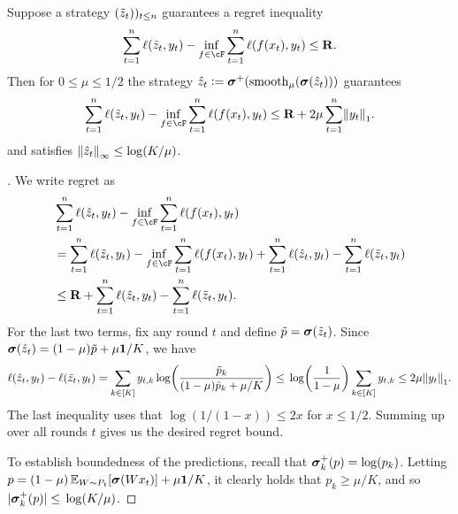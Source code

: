\begin{lemma}
  \label{lem:logistic_bounded}
  Suppose a strategy $(\zt_{t}))_{t\leq{}n}$ guarantees a regret inequality
  \[
    \sum_{t=1}^{n}\ls(\zt_t,y_t) - \inf_{f\in\cF}\sum_{t=1}^{n}\ls(f(x_t),y_t) \leq{} \mathbf{R}.
  \]
  Then for $0\leq\mu\leq{}1/2$ the strategy $\hat{z}_{t} \ldef \mb{\sigma}^{+}\prn*{\smooth\prn*{\mb\sigma(\zh_t)}}$ guarantees
  \[
    \sum_{t=1}^{n}\ls(\zt_t,y_t) - \inf_{f\in\cF}\sum_{t=1}^{n}\ls(f(x_t),y_t) \leq{} \mathbf{R} + 2\mu\sum_{t=1}^{n}\nrm*{y_t}_{1}.
  \]
  and satisfies $\nrm*{\hat{z}_{t}}_{\infty}\leq\log(K/\mu)$.

\end{lemma}
\begin{proof}[]

 We write regret as
\begin{align*}
&\sum_{t=1}^{n}\ls(\zh_t,y_t) - \inf_{f\in\cF}\sum_{t=1}^{n}\ls(f(x_t),y_t) \\ &= 
\sum_{t=1}^{n}\ls(\zt_t,y_t) - \inf_{f\in\cF}\sum_{t=1}^{n}\ls(f(x_t),y_t) + \sum_{t=1}^{n}\ls(\zh_t,y_t) - \sum_{t=1}^{n}\ls(\zt_t,y_t)\\
&\leq{} \mathbf{R} + \sum_{t=1}^{n}\ls(\zh_t,y_t) - \sum_{t=1}^{n}\ls(\zt_t,y_t).
\end{align*}
For the last two terms, fix any round $t$ and define $\tilde{p} = \mb{\sigma}(\zt_t)$. Since $\mb{\sigma}(\zh_t) = (1-\mu) \tilde{p} + \mu \mb{1}/K$, we have
\[
\ls(\zh_t,y_t) - \ls(\zt_t,y_t)
= \sum_{k\in\brk{K}}y_{t,k}\log\prn*{
\frac{\tilde{p}_k}{(1-\mu)\tilde{p}_k + \mu/K}
} \leq{} \log\prn*{
\frac{1}{1-\mu}
}\sum_{k\in\brk{K}}y_{t,k} \leq{} 2\mu\nrm*{y_t}_{1}.
\]
The last inequality uses that $\log(1/(1-x))\leq{}2x$ for $x\leq{}1/2$. Summing up over all rounds $t$ gives us the desired regret bound.

To establish boundedness of the predictions, recall that $\mb{\sigma}_{k}^{+}(p) = \log(p_k)$. Letting $p = (1-\mu)\En_{W\sim{}P_t}\brk*{\mb{\sigma}(Wx_t)} + \mu\ones{}/K$, it clearly holds that $p_{k}\geq{}\mu/K$, and so $|\mb{\sigma}_{k}^{+}(p)|\leq{} \log(K/\mu)$.
\end{proof}


